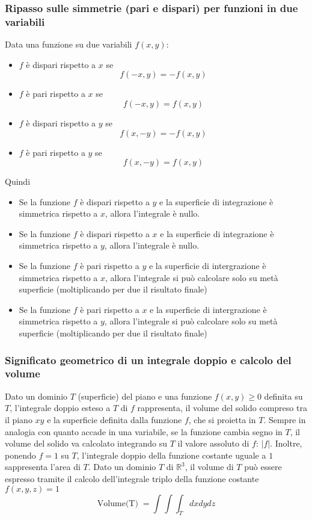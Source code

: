 \subsubsection{Ripasso sulle simmetrie (pari e dispari) per funzioni in due variabili}
Data una funzione su due variabili $f(x,y)$:
\begin{itemize}
    \item $f$ è dispari rispetto a $x$ se 
    \[
        f(-x,y) = -f(x,y)
    \]
    \item $f$ è pari rispetto a $x$ se 
    \[
        f(-x,y) = f(x,y)
    \]
    \item $f$ è dispari rispetto a $y$ se 
    \[
        f(x,-y) = -f(x,y)
    \]
    \item $f$ è pari rispetto a $y$ se 
    \[
        f(x,-y) = f(x,y)
    \]
\end{itemize}
Quindi
\begin{itemize}
    \item Se la funzione $f$ è dispari rispetto a $y$ e la superficie di integrazione è simmetrica rispetto a $x$, allora l'integrale è nullo.
    \item Se la funzione $f$ è dispari rispetto a $x$ e la superficie di integrazione è simmetrica rispetto a $y$, allora l'integrale è nullo.
    \item Se la funzione $f$ è pari rispetto a $y$ e la superficie di intergrazione è simmetrica rispetto a $x$, allora l'integrale si può calcolare solo su metà superficie (moltiplicando per due il risultato finale)  
    \item Se la funzione $f$ è pari rispetto a $x$ e la superficie di intergrazione è simmetrica rispetto a $y$, allora l'integrale si può calcolare solo su metà superficie (moltiplicando per due il risultato finale)
\end{itemize}
\subsubsection{Significato geometrico di un integrale doppio e calcolo del volume}
Dato un dominio $T$ (superficie) del piano e una funzione $f(x,y) \geq 0$ definita su $T$, l'integrale doppio esteso a $T$ di $f$ rappresenta, il volume del solido compreso tra il piano $xy$ e la superficie definita dalla funzione $f$, che si proietta in $T$.\newline
\newline
Sempre in analogia con quanto accade in una variabile, se la funzione cambia segno in $T$, il volume del solido va calcolato integrando su $T$ il valore assoluto di $f$: $|f|$. Inoltre, ponendo $f = 1$ su $T$, l'integrale doppio della funzione costante uguale a $1$ sappresenta l'area di $T$.\newline
\newline
Dato un dominio $T$ di $\mathbb{R}^3$, il volume di $T$ può essere espresso  tramite il calcolo dell'integrale triplo della funzione costante $f(x,y,z) = 1$
\[
    \text{Volume(T)}\; = \int \int \int_{T} dx dy dz
\]
